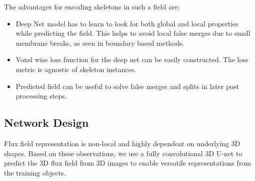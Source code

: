 

The advantages for encoding skeletons in such a field are:
\begin{itemize}
	\item Deep Net model has to learn to look for both global and local properties while predicting the field. This helps to avoid local false merges due to small membrane breaks, as seen in boundary based methods.
	\item Voxel wise loss function for the deep net can be easily constructed. The loss metric is agnostic of skeleton instances.
	\item Predicted field can be useful to solve false merges and splits in later post processing steps.
\end{itemize}


\subsection{Network Design}
Flux field representation is non-local and highly dependent on underlying 3D shapes. Based on these observations, we use a fully convolutional 3D U-net to predict the 3D flux field from 3D images to enable versatile representations from the training objects. 

